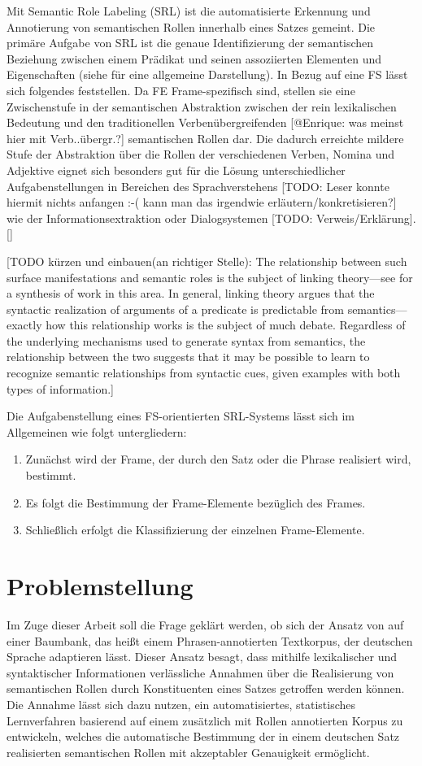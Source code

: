 \documentclass[12pt]{article}
\begin{document}
Mit Semantic Role Labeling (SRL) ist die automatisierte Erkennung und
Annotierung von semantischen Rollen innerhalb eines Satzes gemeint. Die primäre
Aufgabe von SRL ist die genaue Identifizierung der semantischen Beziehung
zwischen einem Prädikat und seinen assoziierten Elementen und Eigenschaften
(siehe \cite{SRL2008} für eine allgemeine Darstellung). In Bezug auf eine FS lässt
sich folgendes feststellen. Da FE Frame-spezifisch sind, stellen sie eine
Zwischenstufe in der semantischen Abstraktion zwischen der rein lexikalischen
Bedeutung und den traditionellen Verbenübergreifenden [@Enrique: was meinst hier mit Verb..übergr.?] semantischen Rollen dar.
Die dadurch erreichte \glqq{}mildere\grqq{} Stufe der Abstraktion über die
Rollen der verschiedenen Verben, Nomina und Adjektive eignet sich besonders gut
für die Lösung unterschiedlicher Aufgabenstellungen in Bereichen des
Sprachverstehens [TODO: Leser konnte hiermit nichts anfangen :-( kann man das irgendwie erläutern/konkretisieren?] wie der Informationsextraktion oder Dialogsystemen [TODO: Verweis/Erklärung]. [\cite{gildea}]

[TODO kürzen und einbauen(an richtiger Stelle): The relationship between such surface manifestations and
semantic roles is the subject of linking theory—see \cite{levinrappaport}
for a synthesis of work in this area. In general, linking theory argues that the syntactic
realization of arguments of a predicate is predictable from semantics—exactly how this
relationship works is the subject of much debate. Regardless of the underlying mechanisms
used to generate syntax from semantics, the relationship between the two suggests
that it may be possible to learn to recognize semantic relationships from syntactic
cues, given examples with both types of information.]

Die Aufgabenstellung eines FS-orientierten SRL-Systems lässt sich im Allgemeinen
wie folgt untergliedern:
\begin{enumerate}
\item Zunächst wird der Frame, der durch den Satz oder die Phrase realisiert wird, bestimmt.
\item Es folgt die Bestimmung der Frame-Elemente bezüglich des Frames. 
\item Schließlich erfolgt die Klassifizierung der einzelnen Frame-Elemente.
\end{enumerate}


\section{Problemstellung}
Im Zuge dieser Arbeit soll die Frage geklärt werden, ob sich der Ansatz von \cite{gildea} auf einer Baumbank, das heißt einem Phrasen-annotierten Textkorpus, der deutschen Sprache adaptieren lässt. Dieser Ansatz besagt, dass mithilfe lexikalischer und syntaktischer Informationen verlässliche Annahmen über die Realisierung von semantischen Rollen durch Konstituenten eines Satzes getroffen werden können. Die Annahme lässt sich dazu nutzen, ein automatisiertes, statistisches Lernverfahren basierend auf einem zusätzlich mit Rollen annotierten Korpus zu entwickeln, welches die automatische Bestimmung der in einem deutschen Satz realisierten semantischen Rollen mit akzeptabler Genauigkeit ermöglicht.
\end{document}
